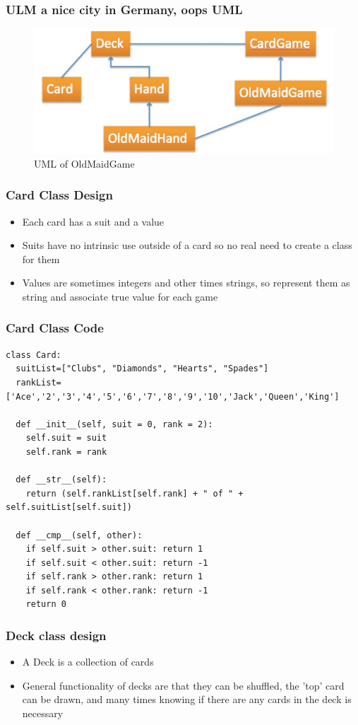 \documentclass{beamer}
\newcommand\Fontviii{\fontsize{8}{9}\selectfont}
\begin{document}
\begin{frame}[fragile]
\frametitle{ULM a nice city in Germany, oops UML}
\begin{figure}
\includegraphics[scale=0.45]{ulm_uml.jpg} 
\caption{UML of OldMaidGame}
\end{figure}
\end{frame}

\begin{frame}[fragile]
\frametitle{Card Class Design}
\begin{itemize}
\item Each card has a suit and a value
\item Suits have no intrinsic use outside of a card so no real need to create a class for them
\item Values are sometimes integers and other times strings, so represent them as string and associate true value for each game
\end{itemize} 
\end{frame}

\begin{frame}[fragile]
\frametitle{Card Class Code}
\Fontviii
\begin{lstlisting}
class Card:
  suitList=["Clubs", "Diamonds", "Hearts", "Spades"]
  rankList=['Ace','2','3','4','5','6','7','8','9','10','Jack','Queen','King']

  def __init__(self, suit = 0, rank = 2):
    self.suit = suit
    self.rank = rank

  def __str__(self):
    return (self.rankList[self.rank] + " of " + self.suitList[self.suit])

  def __cmp__(self, other):
    if self.suit > other.suit: return 1
    if self.suit < other.suit: return -1
    if self.rank > other.rank: return 1
    if self.rank < other.rank: return -1
	return 0
\end{lstlisting}
\end{frame}

\begin{frame}[fragile]
\frametitle{Deck class design}
\begin{itemize}
\item A Deck is a collection of cards
\item General functionality of decks are that they can be shuffled, the 'top' card can be drawn, and many times knowing if there are any cards in the deck is necessary 
\end{itemize} 
\end{frame}
\end{document}
